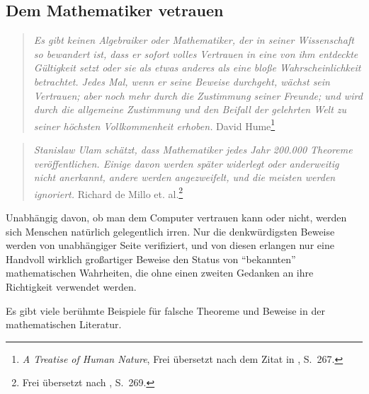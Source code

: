 \subsection{Dem Mathematiker vetrauen}\label{trust}

\begin{quote}
  {\em Es gibt keinen Algebraiker oder Mathematiker, der in seiner Wissenschaft so bewandert ist, dass er sofort volles Vertrauen in eine von ihm entdeckte Gültigkeit setzt oder sie als etwas anderes als eine bloße Wahrscheinlichkeit betrachtet.  Jedes Mal, wenn er seine Beweise durchgeht, wächst sein Vertrauen; aber noch mehr durch die Zustimmung seiner Freunde; und wird durch die allgemeine Zustimmung und den Beifall der gelehrten Welt zu seiner höchsten Vollkommenheit erhoben.}
  \flushright\sc David Hume\footnote{{\em A Treatise of Human Nature}, Frei übersetzt nach dem Zitat in \cite{deMillo}, S.~267.}\\
\end{quote}

\begin{quote}
  {\em Stanislaw Ulam schätzt, dass Mathematiker jedes Jahr 200.000 Theoreme veröffentlichen.  Einige davon werden später widerlegt oder anderweitig nicht anerkannt, andere werden angezweifelt, und die meisten werden ignoriert.}
  \flushright\sc Richard de Millo et. al.\footnote{Frei übersetzt nach \cite{deMillo}, S.~269.}\\
\end{quote}

Unabhängig davon, ob man dem Computer vertrauen kann oder nicht, werden sich Menschen natürlich gelegentlich irren. Nur die denkwürdigsten Beweise werden von unabhängiger Seite verifiziert, und von diesen erlangen nur eine Handvoll wirklich großartiger Beweise den Status von "`bekannten"' mathematischen Wahrheiten, die ohne einen zweiten Gedanken an ihre Richtigkeit verwendet werden.

Es gibt viele berühmte Beispiele für falsche Theoreme und Beweise in der mathematischen Literatur.

